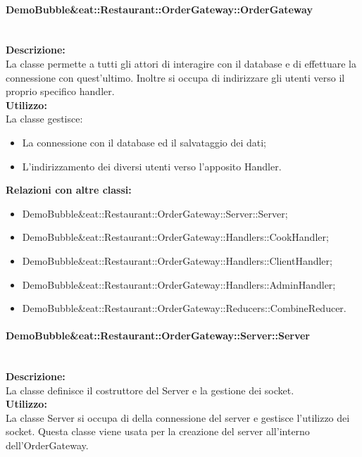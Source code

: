 \paragraph{Demo\-Bubble\&eat\-::Restaurant\-::Order\-Gateway\-::Order\-Gateway}\label{eat-gateway}\mbox{}\\
\textbf{Descrizione:}\\
La classe permette a tutti gli attori di interagire con il database e di effettuare la connessione con quest'ultimo. Inoltre si occupa di indirizzare gli utenti verso il proprio specifico handler.\\
\textbf{Utilizzo:}\\
La classe gestisce:
\begin{itemize}
	\item La connessione con il database ed il salvataggio dei dati;
	\item L'indirizzamento dei diversi utenti verso l'apposito Handler.\\
\end{itemize}
\textbf{Relazioni con altre classi:}\\
\begin{itemize}
	\item {Demo\-Bubble\&eat\-::Restaurant\-::Order\-Gateway\-::Server\-::Server};
	\item {Demo\-Bubble\&eat\-::Restaurant\-::Order\-Gateway\-::Handlers\-::Cook\-Handler};
	\item {Demo\-Bubble\&eat\-::Restaurant\-::Order\-Gateway\-::Handlers\-::Client\-Handler};
	\item {Demo\-Bubble\&eat\-::Restaurant\-::Order\-Gateway\-::Handlers\-::Admin\-Handler};
	\item {Demo\-Bubble\&eat\-::Restaurant\-::Order\-Gateway\-::Reducers\-::Combine\-Reducer}.
\end{itemize}

\paragraph{Demo\-Bubble\&eat\-::Restaurant\-::Order\-Gateway\-::Server\-::Server}\label{eat-Actions}\mbox{}\\
\textbf{Descrizione:}\\
La classe definisce il costruttore del Server e la gestione dei socket.\\
\textbf{Utilizzo:}\\
La classe Server si occupa di della connessione del server e gestisce l'utilizzo dei socket. Questa classe viene usata per la creazione del server all'interno dell'Order\-Gateway.

